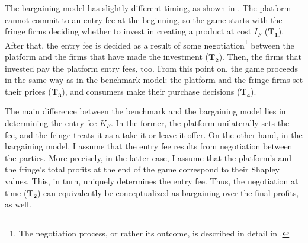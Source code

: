 The bargaining model has slightly different timing, as shown in .
The platform cannot commit to an entry fee at the beginning, so the game starts with the fringe firms deciding whether to invest in creating a product at cost $I_F$ ($\mathbf{T_1}$).
After that, the entry fee is decided as a result of some negotiation\footnote{
    The negotiation process, or rather its outcome, is described in detail in .
} between the platform and the firms that have made the investment ($\mathbf{T_2}$).
Then, the firms that invested pay the platform entry fees, too.
From this point on, the game proceeds in the same way as in the benchmark model: the platform and the fringe firms set their prices ($\mathbf{T_3}$), and consumers make their purchase decisions ($\mathbf{T_4}$). 

The main difference between the benchmark and the bargaining model lies in determining the entry fee $K_F$.
In the former, the platform unilaterally sets the fee, and the fringe treats it as a take-it-or-leave-it offer.
On the other hand, in the bargaining model, I assume that the entry fee results from negotiation between the parties.
More precisely, in the latter case, I assume that the platform's and the fringe's total profits at the end of the game correspond to their Shapley values.
This, in turn, uniquely determines the entry fee.
Thus, the negotiation at time ($\mathbf{T_2}$) can equivalently be conceptualized as bargaining over the final profits, as well.

